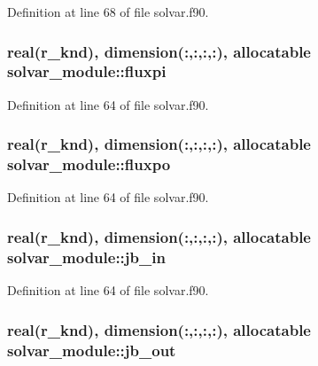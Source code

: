 Definition at line 68 of file solvar.\-f90.

\hypertarget{classsolvar__module_a9d3b4c1745b4b9a6145e2c08530d3daa}{
\subsubsection[{fluxpi}]{\setlength{\rightskip}{0pt plus 5cm}real(r\-\_\-knd), dimension(\-:,\-:,\-:,\-:), allocatable solvar\-\_\-module\-::fluxpi}}\label{classsolvar__module_a9d3b4c1745b4b9a6145e2c08530d3daa}


Definition at line 64 of file solvar.\-f90.

\hypertarget{classsolvar__module_a669bfbe1f13db0527664112817616ca8}{
\subsubsection[{fluxpo}]{\setlength{\rightskip}{0pt plus 5cm}real(r\-\_\-knd), dimension(\-:,\-:,\-:,\-:), allocatable solvar\-\_\-module\-::fluxpo}}\label{classsolvar__module_a669bfbe1f13db0527664112817616ca8}


Definition at line 64 of file solvar.\-f90.

\hypertarget{classsolvar__module_a1fdec8e2a20607eda34ee4fd101908b6}{
\subsubsection[{jb\-\_\-in}]{\setlength{\rightskip}{0pt plus 5cm}real(r\-\_\-knd), dimension(\-:,\-:,\-:,\-:), allocatable solvar\-\_\-module\-::jb\-\_\-in}}\label{classsolvar__module_a1fdec8e2a20607eda34ee4fd101908b6}


Definition at line 64 of file solvar.\-f90.

\hypertarget{classsolvar__module_a29676d4c4d7035869ce09911a15bbd58}{
\subsubsection[{jb\-\_\-out}]{\setlength{\rightskip}{0pt plus 5cm}real(r\-\_\-knd), dimension(\-:,\-:,\-:,\-:), allocatable solvar\-\_\-module\-::jb\-\_\-out}}\label{classsolvar__module_a29676d4c4d7035869ce09911a15bbd58}


